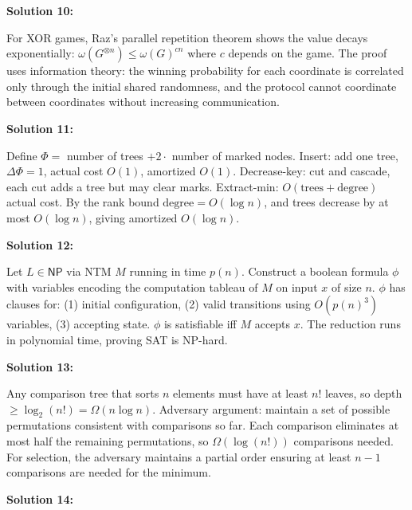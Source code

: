\documentclass[12pt,a4paper]{exam}
\begin{document}
\vspace{0.5cm}

\textbf{Solution 10:}

For XOR games, Raz's parallel repetition theorem shows the value decays exponentially: $\omega(G^{\otimes n}) \leq \omega(G)^{c n}$ where $c$ depends on the game. The proof uses information theory: the winning probability for each coordinate is correlated only through the initial shared randomness, and the protocol cannot coordinate between coordinates without increasing communication.

\vspace{0.5cm}

\textbf{Solution 11:}

Define $\Phi =$ number of trees $+ 2 \cdot$ number of marked nodes. Insert: add one tree, $\Delta\Phi = 1$, actual cost $O(1)$, amortized $O(1)$. Decrease-key: cut and cascade, each cut adds a tree but may clear marks. Extract-min: $O(\text{trees} + \text{degree})$ actual cost. By the rank bound $\text{degree} = O(\log n)$, and trees decrease by at most $O(\log n)$, giving amortized $O(\log n)$.

\vspace{0.5cm}

\textbf{Solution 12:}

Let $L \in \mathsf{NP}$ via NTM $M$ running in time $p(n)$. Construct a boolean formula $\phi$ with variables encoding the computation tableau of $M$ on input $x$ of size $n$. $\phi$ has clauses for: (1) initial configuration, (2) valid transitions using $O(p(n)^3)$ variables, (3) accepting state. $\phi$ is satisfiable iff $M$ accepts $x$. The reduction runs in polynomial time, proving SAT is NP-hard.

\vspace{0.5cm}

\textbf{Solution 13:}

Any comparison tree that sorts $n$ elements must have at least $n!$ leaves, so depth $\geq \log_2(n!) = \Omega(n \log n)$. Adversary argument: maintain a set of possible permutations consistent with comparisons so far. Each comparison eliminates at most half the remaining permutations, so $\Omega(\log(n!))$ comparisons needed. For selection, the adversary maintains a partial order ensuring at least $n-1$ comparisons are needed for the minimum.

\vspace{0.5cm}

\textbf{Solution 14:}
\end{document}
